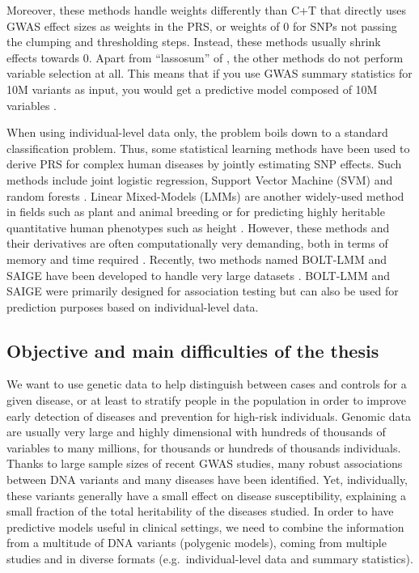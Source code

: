 Moreover, these methods handle weights differently than C+T that directly uses GWAS effect sizes as weights in the PRS, or weights of 0 for SNPs not passing the clumping and thresholding steps. Instead, these methods usually shrink effects towards 0. 
Apart from ``lassosum'' of \cite{mak2017polygenic}, the other methods do not perform variable selection at all. This means that if you use GWAS summary statistics for 10M variants as input, you would get a predictive model composed of 10M variables \cite[]{janssens2019polygenic}.

When using individual-level data only, the problem boils down to a standard classification problem. Thus, some statistical learning methods have been used to derive PRS for complex human diseases by jointly estimating SNP effects. Such methods include joint logistic regression, Support Vector Machine (SVM) and random forests \cite[]{wei2009disease,abraham2012sparsnp,abraham2014accurate,botta2014exploiting,okser2014regularized}.
Linear Mixed-Models (LMMs) are another widely-used method in fields such as plant and animal breeding or for predicting highly heritable quantitative human phenotypes such as height \cite[]{yang2010common}. 
However, these methods and their derivatives are often computationally very demanding, both in terms of memory and time required \cite[]{zhou2013polygenic,golan2014effective,speed2014multiblup,maier2015joint}.
Recently, two methods named BOLT-LMM and SAIGE have been developed to handle very large datasets \cite[]{loh2018mixed,zhou2018efficiently}. 
BOLT-LMM and SAIGE were primarily designed for association testing but can also be used for prediction purposes based on individual-level data.

\subsection{Objective and main difficulties of the thesis}

We want to use genetic data to help distinguish between cases and controls for a given disease, or at least to stratify people in the population in order to improve early detection of diseases and prevention for high-risk individuals.
Genomic data are usually very large and highly dimensional with hundreds of thousands of variables to many millions, for thousands or hundreds of thousands individuals.
Thanks to large sample sizes of recent GWAS studies, many robust associations between DNA variants and many diseases have been identified. Yet, individually, these variants generally have a small effect on disease susceptibility, explaining a small fraction of the total heritability of the diseases studied. 
In order to have predictive models useful in clinical settings, we need to combine the information from a multitude of DNA variants (polygenic models), coming from multiple studies and in diverse formats (e.g.\ individual-level data and summary statistics).


